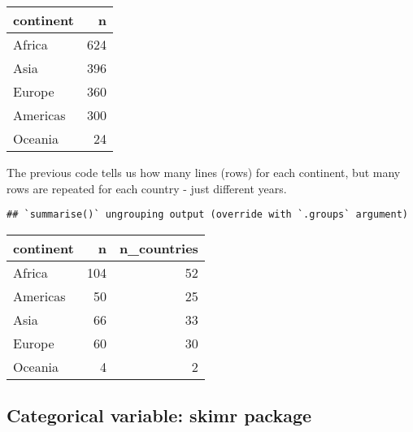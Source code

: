 \documentclass[
]{book}
\newenvironment{Shaded}{\begin{snugshade}}{\end{snugshade}}
\newcommand{\DataTypeTok}[1]{\textcolor[rgb]{0.13,0.29,0.53}{#1}}
\newcommand{\DecValTok}[1]{\textcolor[rgb]{0.00,0.00,0.81}{#1}}
\newcommand{\KeywordTok}[1]{\textcolor[rgb]{0.13,0.29,0.53}{\textbf{#1}}}
\newcommand{\NormalTok}[1]{#1}
\newcommand{\OperatorTok}[1]{\textcolor[rgb]{0.81,0.36,0.00}{\textbf{#1}}}
\newcommand{\StringTok}[1]{\textcolor[rgb]{0.31,0.60,0.02}{#1}}
\begin{document}
\begin{tabular}{l|r}
\hline
continent & n\\
\hline
Africa & 624\\
\hline
Asia & 396\\
\hline
Europe & 360\\
\hline
Americas & 300\\
\hline
Oceania & 24\\
\hline
\end{tabular}

The previous code tells us how many lines (rows) for each continent, but many rows are repeated for each country - just different years.

\begin{Shaded}
\end{Shaded}

\begin{verbatim}
## `summarise()` ungrouping output (override with `.groups` argument)
\end{verbatim}

\begin{tabular}{l|r|r}
\hline
continent & n & n\_countries\\
\hline
Africa & 104 & 52\\
\hline
Americas & 50 & 25\\
\hline
Asia & 66 & 33\\
\hline
Europe & 60 & 30\\
\hline
Oceania & 4 & 2\\
\hline
\end{tabular}

\hypertarget{categorical-variable-skimr-package}{%
\subsection{Categorical variable: skimr package}\label{categorical-variable-skimr-package}}
\end{document}
